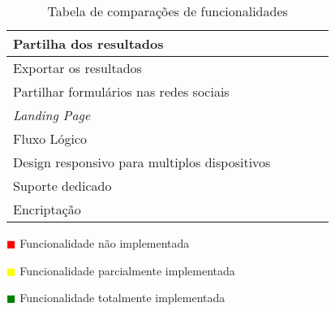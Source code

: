 \begin{table}[!ht]
\begin{center}
\begin{tabular}{|p{4cm}|p{0.1cm}|p{0.1cm}|p{0.1cm}|p{0.1cm}|}
		Partilha dos resultados &  &  &  &  \\ \hline
		
		Exportar os resultados &  &  &  &  \\ \hline
		
		Partilhar formulários nas redes sociais &  &  &  &  \\ \hline
		
		\textit{Landing Page} &  &  &  &  \\ \hline
		
		Fluxo Lógico &  &  &  &  \\ \hline
		
		Design responsivo para multiplos dispositivos &  &  &  &  \\ \hline
		
		Suporte dedicado &  &  &  &  \\ \hline
		
		Encriptação &  &  &  &  \\ \hline
		
		
					
	\end{tabular}
\end{center}
		\hspace{1.2cm}	\textcolor{red}{$\blacksquare$} Funcionalidade não implementada
		
	   \hspace{1.2cm}     \textcolor{yellow}{$\blacksquare$} Funcionalidade parcialmente implementada
	   
	    \hspace{1.2cm}     \textcolor{green}{$\blacksquare$} Funcionalidade totalmente implementada 
	   \begin{center}
\caption{Tabela de comparações de funcionalidades}
\label{tab:comparacao1}
\end{center}
\end{table}

\newpage
		

